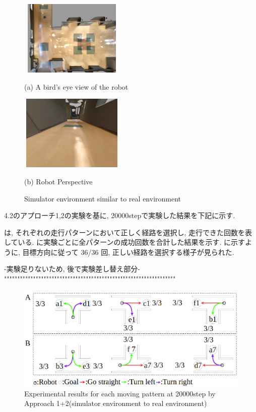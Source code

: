 \begin{figure}[h]
  \centering
  \begin{minipage}[b]{67mm}
    \centering
    \includegraphics[width=50mm, height=36mm]{images/real_sim_up.png}
    \caption*{(a) A bird's eye view of the robot}
  \end{minipage} 
  \begin{minipage}[b]{67mm}
    \centering
    \includegraphics[width=50mm, height=36mm]{images/real_sim_robot.png}
    \caption*{(b) Robot Perspective}
  \end{minipage}
  \caption{Simulator environment similar to real environment}
  \label{Fig:real_sim}
\end{figure}

4.2のアプローチ1,2の実験を基に, 20000stepで実験した結果を下記に示す.

 は, それぞれの走行パターンにおいて正しく経路を選択し, 走行できた回数を表している.  に実験ごとに全パターンの成功回数を合計した結果を示す.  に示すように, 目標方向に従って 36/36 回, 正しい経路を選択する様子が見られた.

\vspace{1cm}
-実験足りないため, 後で実験差し替え部分-\\
"""""""""""""""""""""""""""""""""""""""""""""""""""""""""""""""""
\begin{figure}[hbtp]
  \centering
 \includegraphics[keepaspectratio, scale=0.35]
      {images/real_sim.png}
 \caption{Experimental results for each moving pattern at 20000step by Approach 1+2(simulator environment to real environment)}
 \label{Fig:real_sim}
\end{figure} 

